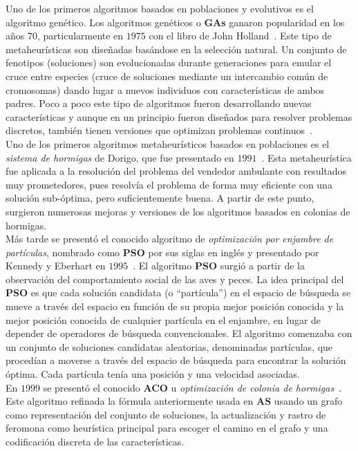 Uno de los primeros algoritmos basados en poblaciones y evolutivos es el algoritmo genético. Los algoritmos genéticos o \textbf{GAs} ganaron popularidad en los años $70$, particularmente en $1975$ con el libro de John Holland~\cite{Holland:1975}. Este tipo de metaheurísticas son diseñadas basándose en la selección natural. Un conjunto de fenotipos (soluciones) son evolucionadas durante generaciones para emular el cruce entre especies (cruce de soluciones mediante un intercambio común de cromosomas) dando lugar a nuevos individuos con características de ambos padres. Poco a poco este tipo de algoritmos fueron desarrollando nuevas características y aunque en un principio fueron diseñados para resolver problemas discretos, también tienen versiones que optimizan problemas continuos~\cite{eiben2015}.\\[6pt]
Uno de los primeros algoritmos metaheurísticos basados en poblaciones es el \textit{sistema de hormigas} de Dorigo, que fue presentado en $1991$~\cite{as}. Esta metaheurística fue aplicada a la resolución del problema del vendedor ambulante con resultados muy prometedores, pues resolvía el problema de forma muy eficiente con una solución sub-óptima, pero suficientemente buena. A partir de este punto, surgieron numerosas mejoras y versiones de los algoritmos basados en colonias de hormigas.\\[6pt]
Más tarde se presentó el conocido algoritmo de \textit{optimización por enjambre de partículas}, nombrado como \textbf{PSO} por sus siglas en inglés y presentado por Kennedy y Eberhart en $1995$~\cite{kennedy_particle_1995}. El algoritmo \textbf{PSO} surgió a partir de la observación del comportamiento social de las aves y peces. La idea principal del \textbf{PSO} es que cada solución candidata (o ``partícula'') en el espacio de búsqueda se mueve a través del espacio en función de su propia mejor posición conocida y la mejor posición conocida de cualquier partícula en el enjambre, en lugar de depender de operadores de búsqueda convencionales. El algoritmo comenzaba con un conjunto de soluciones candidatas aleatorias, denominadas partículas, que procedían a moverse a través del espacio de búsqueda para encontrar la solución óptima. Cada partícula tenía una posición y una velocidad asociadas.\\[6pt]
En $1999$ se presentó el conocido \textbf{ACO} u \textit{optimización de colonia de hormigas}~\cite{dorigo_ant_1999}. Este algoritmo refinada la fórmula anteriormente usada en \textbf{AS} usando un grafo como representación del conjunto de soluciones, la actualización y rastro de feromona como heurística principal para escoger el camino en el grafo y una codificación discreta de las características.\\[6pt]
